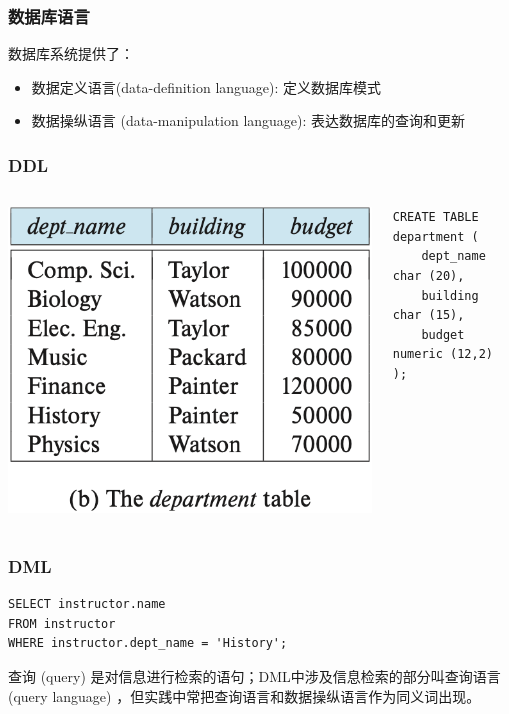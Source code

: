 \documentclass[aspectratio=169, 14pt]{beamer}
\begin{document}
\begin{frame}
	\frametitle{数据库语言}
	数据库系统提供了：

	\begin{itemize}
		\item 数据定义语言(data-definition language): 定义数据库模式
		\item 数据操纵语言 (data-manipulation language): 表达数据库的查询和更新
	\end{itemize}
\end{frame}
\begin{frame}[fragile]
	\frametitle{DDL}
	\begin{columns}
		\includegraphics[width=\textwidth]{table/department}
		\begin{verbatim}
CREATE TABLE department (
    dept_name   char (20),
    building   char (15),
    budget  numeric (12,2)
);     
    \end{verbatim}
	\end{columns}
\end{frame}

\begin{frame}[fragile]
	\frametitle{DML}
	\begin{verbatim}
SELECT instructor.name
FROM instructor
WHERE instructor.dept_name = 'History';   
    \end{verbatim}
	查询 (query) 是对信息进行检索的语句；DML中涉及信息检索的部分叫\alert{查询语言 (query language)} ，但实践中常把查询语言和数据操纵语言作为同义词出现。
\end{frame}
\end{document}

